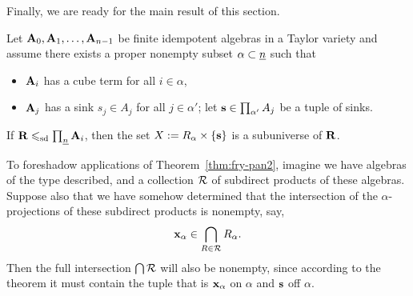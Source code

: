 Finally, we are ready for the main result of this section.

\begin{theorem}
\label{thm:fry-pan2}
  Let $\mathbf{A}_0, \mathbf{A}_1, \dots, \mathbf{A}_{n-1}$ be finite idempotent algebras in a Taylor
  variety and assume there exists a proper nonempty subset $\alpha \subset \underline{n}$ such that
  \begin{itemize}
  \item $\mathbf{A}_i$ has a cube term for all $i \in \alpha$,
  \item $\mathbf{A}_j$ has a sink $s_j \in A_j$ for all $j \in \alpha'$;
    let $\mathbf{s} \in \prod_{\alpha'}A_j$ be a tuple of sinks.
  \end{itemize}
   If $\mathbf{R} \leqslant_{\mathrm{sd}} \prod_{\underline{n}} \mathbf{A}_i$, then the set $X:=R_\alpha \times \{\mathbf{s}\}$
  is a subuniverse of $\mathbf{R}$.
\end{theorem}
\begin{remark}
To foreshadow applications of
Theorem~\ref{thm:fry-pan2}, imagine we have 
algebras of the type described, and a collection
$\mathcal{R}$ of subdirect products of these algebras. Suppose also that we have somehow
determined that the intersection of the $\alpha$-projections of these subdirect
products is nonempty, say,
\[\mathbf{x}_\alpha \in \bigcap_{R \in \mathcal{R}} R_\alpha.\]
Then the full intersection $\bigcap \mathcal{R}$ will also be nonempty, since
according to the theorem it must
contain the tuple that is $\mathbf{x}_\alpha$ on $\alpha$ and $\mathbf{s}$ off $\alpha$.
\end{remark}


